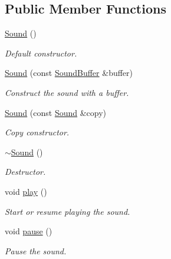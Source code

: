 \subsection*{Public Member Functions}
\begin{DoxyCompactItemize}
\item 
\mbox{\label{classsf_1_1_sound_a36ab74beaaa953d9879c933ddd246282}} 
\hyperlink{classsf_1_1_sound_a36ab74beaaa953d9879c933ddd246282}{Sound} ()
\begin{DoxyCompactList}\small\item\em Default constructor. \end{DoxyCompactList}\item 
\hyperlink{classsf_1_1_sound_a3b1cfc19a856d4ff8c079ee41bb78e69}{Sound} (const \hyperlink{classsf_1_1_sound_buffer}{Sound\+Buffer} \&buffer)
\begin{DoxyCompactList}\small\item\em Construct the sound with a buffer. \end{DoxyCompactList}\item 
\hyperlink{classsf_1_1_sound_ae05eeed6377932694d86b3011be366c0}{Sound} (const \hyperlink{classsf_1_1_sound}{Sound} \&copy)
\begin{DoxyCompactList}\small\item\em Copy constructor. \end{DoxyCompactList}\item 
\mbox{\label{classsf_1_1_sound_ad0792c35310eba2dffd8489c80fad076}} 
\hyperlink{classsf_1_1_sound_ad0792c35310eba2dffd8489c80fad076}{$\sim$\+Sound} ()
\begin{DoxyCompactList}\small\item\em Destructor. \end{DoxyCompactList}\item 
void \hyperlink{classsf_1_1_sound_a2953ffe632536e72e696fd880ced2532}{play} ()
\begin{DoxyCompactList}\small\item\em Start or resume playing the sound. \end{DoxyCompactList}\item 
void \hyperlink{classsf_1_1_sound_a5eeb25815bfa8cdc4a6cc000b7b19ad5}{pause} ()
\begin{DoxyCompactList}\small\item\em Pause the sound. \end{DoxyCompactList}\item 

\end{DoxyCompactItemize}
